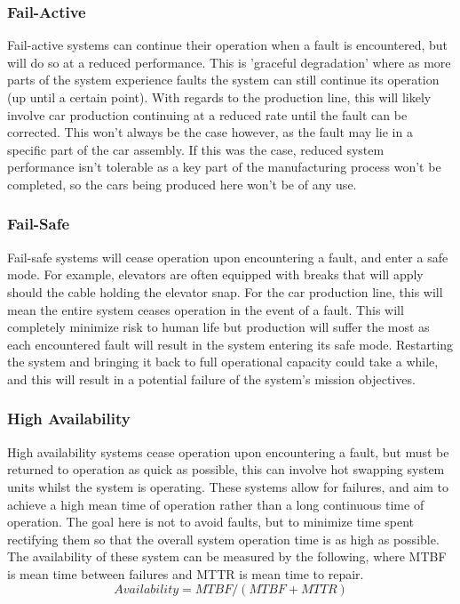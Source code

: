 \documentclass[]{report}
\begin{document}
				\subsubsection{Fail-Active}
				Fail-active systems can continue their operation when a fault is encountered, but will do so at a reduced performance. This is 'graceful degradation' where as more parts of the system experience faults the system can still continue its operation (up until a certain point). With regards to the production line, this will likely involve car production continuing at a reduced rate until the fault can be corrected. This won't always be the case however, as the fault may lie in a specific part of the car assembly. If this was the case, reduced system performance isn't tolerable as a key part of the manufacturing process won't be completed, so the cars being produced here won't be of any use.
				
				\subsubsection{Fail-Safe}
				Fail-safe systems will cease operation upon encountering a fault, and enter a safe mode. For example, elevators are often equipped with breaks that will apply should the cable holding the elevator snap. For the car production line, this will mean the entire system ceases operation in the event of a fault. This will completely minimize risk to human life but production will suffer the most as each encountered fault will result in the system entering its safe mode. Restarting the system and bringing it back to full operational capacity could take a while, and this will result in a potential failure of the system's mission objectives.
				
				\subsubsection{High Availability}
				High availability systems cease operation upon encountering a fault, but must be returned to operation as quick as possible, this can involve hot swapping system units whilst the system is operating. These systems allow for failures, and aim to achieve a high mean time of operation rather than a long continuous time of operation. The goal here is not to avoid faults, but to minimize time spent rectifying them so that the overall system operation time is as high as possible\cite{gray1991high}. The availability of these system can be measured by the following, where MTBF is mean time between failures and MTTR is mean time to repair.
				\begin{equation*}
				Availability = MTBF/(MTBF + MTTR)
				\end{equation*}
				
\end{document}

